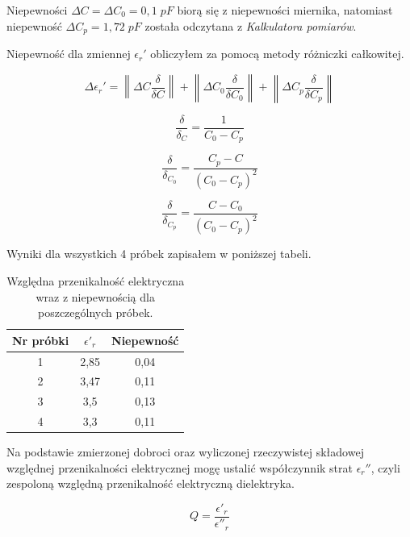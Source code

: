 \documentclass[polish, a4paper]{article}
\begin{document}
Niepewności $\Delta C = \Delta C_0 = 0,1 \; pF$ biorą się z niepewności miernika, natomiast 
niepewność $\Delta C_p = 1,72 \; pF$ została odczytana z \emph{Kalkulatora pomiarów}.

Niepewność dla zmiennej $\epsilon_r'$ obliczyłem za pomocą metody różniczki całkowitej.

\begin{equation}
\Delta \epsilon_r' = 
\left\| \Delta C \frac{\delta}{\delta C} \right\| +
\left\| \Delta C_0 \frac{\delta}{\delta C_0}  \right\| + 
\left\| \Delta C_p \frac{\delta}{\delta C_p}  \right\|
\end{equation}


\begin{equation}
\frac{\delta}{\delta_C} 
= 
\frac{1}{C_0 - C_p} 
\end{equation}

\begin{equation}
\frac{\delta}{\delta_C_0} 
= 
\frac{C_p - C}{(C_0 - C_p)^2} 
\end{equation}

\begin{equation}
\frac{\delta}{\delta_C_p} 
= 
\frac{C - C_0}{(C_0 - C_p)^2} 
\end{equation}

Wyniki dla wszystkich 4 próbek zapisałem w poniższej tabeli.
\begin{table}[H]
    \centering
    \begin{tabular}{|c|c|c|}
    \hline
        \textbf{Nr próbki} & \textbf{$\epsilon'_r$} & \textbf{Niepewność} \\ \hline
        1 & 2,85 & 0,04 \\ \hline
        2 & 3,47 & 0,11 \\ \hline
        3 & 3,5 & 0,13 \\ \hline
        4 & 3,3 & 0,11 \\ \hline
    \end{tabular}
    \caption{Względna przenikalność elektryczna wraz z niepewnością dla poszczególnych próbek.}
\end{table}


Na podstawie zmierzonej dobroci oraz 
wyliczonej rzeczywistej składowej względnej przenikalności elektrycznej
mogę ustalić współczynnik strat $\epsilon_r''$, czyli zespoloną względną przenikalność elektryczną dielektryka.


\begin{equation}
Q = \frac{\epsilon'_r}{\epsilon''_r}
\end{equation}
\end{document}
